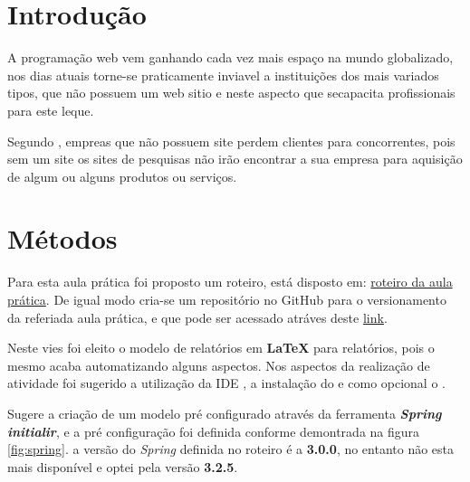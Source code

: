 
\section{Introdução}

\par A programação web vem ganhando cada vez mais espaço na mundo globalizado, nos dias atuais torne-se praticamente inviavel a instituições dos mais variados tipos, que não possuem um web sitio e neste aspecto que secapacita profissionais para este leque.
\par Segundo , empreas que não possuem site perdem clientes para concorrentes, pois sem um site os sites de pesquisas não irão encontrar a sua empresa para aquisição de algum ou alguns produtos ou serviços.




\section{Métodos}
\par Para esta aula prática foi proposto um roteiro, está disposto em: \href {https://github.com/ENGENHARIA-DE-SOFTWARE-UNOPAR/web-project/blob/main/Roteiro%20aula%20pr%C3%A1tica.pdf} {roteiro da aula prática}. De igual modo cria-se um repositório no GitHub para o versionamento da referiada aula prática, e que pode ser acessado atráves deste \href {https://github.com/ENGENHARIA-DE-SOFTWARE-UNOPAR/web-project} {link}.
\par Neste vies foi eleito o modelo de relatórios em \textbf{LaTeX} para relatórios, pois o mesmo acaba automatizando alguns aspectos. Nos aspectos da realização de atividade foi sugerido a utilização da IDE , a instalação do  e como opcional o .
\par Sugere a criação de um modelo pré configurado através da ferramenta \textit{\textbf{Spring initialir}}, e a pré configuração foi definida conforme demontrada na figura \ref{fig:spring}. a versão do \textit{Spring} definida no roteiro é a \textbf{3.0.0}, no entanto não esta mais disponível e optei pela versão \textbf{3.2.5}.




